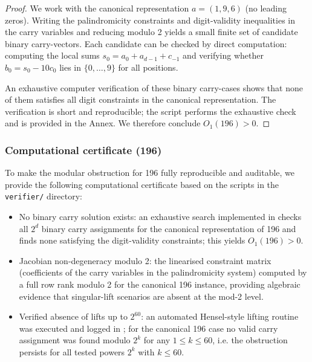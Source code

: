 \documentclass[12pt,a4paper]{article}
\begin{document}
\begin{proof}
We work with the canonical representation $a=(1,9,6)$ (no leading zeros). Writing the palindromicity constraints and digit-validity inequalities in the carry variables and reducing modulo 2 yields a small finite set of candidate binary carry-vectors. Each candidate can be checked by direct computation: computing the local sums $s_0=a_0+a_{d-1}+c_{-1}$ and verifying whether $b_0=s_0-10c_0$ lies in $\{0,\ldots,9\}$ for all positions.

An exhaustive computer verification of these binary carry-cases shows that none of them satisfies all digit constraints in the canonical representation. The verification is short and reproducible; the script \texttt{} performs the exhaustive check and is provided in the Annex. We therefore conclude $O_1(196)>0$.
\end{proof}

\subsubsection*{Computational certificate (196)}
To make the modular obstruction for 196 fully reproducible and auditable, we provide the following computational certificate based on the scripts in the \texttt{verifier/} directory:
\begin{itemize}
\item No binary carry solution exists: an exhaustive search implemented in \texttt{} checks all $2^d$ binary carry assignments for the canonical representation of 196 and finds none satisfying the digit-validity constraints; this yields $O_1(196)>0$.
\item Jacobian non-degeneracy modulo 2: the linearised constraint matrix (coefficients of the carry variables in the palindromicity system) computed by \texttt{} a full row rank modulo 2 for the canonical 196 instance, providing algebraic evidence that singular-lift scenarios are absent at the mod-2 level.
\item Verified absence of lifts up to $2^{60}$: an automated Hensel-style lifting routine was executed and logged in \texttt{}; for the canonical 196 case no valid carry assignment was found modulo $2^k$ for any $1\le k\le 60$, i.e. the obstruction persists for all tested powers $2^k$ with $k\le 60$.
\end{itemize}
\end{document}
